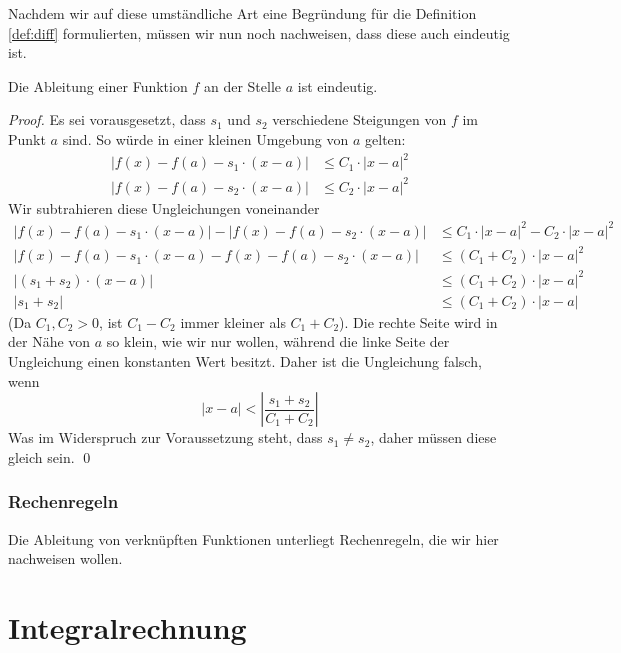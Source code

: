 Nachdem wir auf diese umständliche Art eine Begründung für die Definition \ref{def:diff} formulierten, müssen wir nun noch nachweisen, dass diese auch eindeutig ist. 

\begin{lemma}
Die Ableitung einer Funktion $f$ an der Stelle $a$ ist eindeutig. 
\end{lemma}
\begin{proof}
Es sei vorausgesetzt, dass $s_1$ und $s_2$ verschiedene Steigungen von $f$ im Punkt $a$ sind. So würde in einer kleinen Umgebung von $a$ gelten:
\begin{equation*}
\begin{split}
|f(x)-f(a) -s_1\cdot (x-a)| &\le C_1\cdot |x-a|^2 \\
|f(x)-f(a) -s_2\cdot (x-a)| &\le C_2\cdot |x-a|^2
\end{split}
\end{equation*}
Wir subtrahieren diese Ungleichungen voneinander
\begin{equation}
\begin{split}
|f(x)-f(a) -s_1\cdot (x-a)|-|f(x)-f(a) -s_2\cdot (x-a)| &\le C_1\cdot |x-a|^2-C_2\cdot |x-a|^2 \\
|f(x)-f(a) -s_1\cdot (x-a)-f(x)-f(a) -s_2\cdot (x-a)| &\le (C_1+C_2)\cdot |x-a|^2 \\
|(s_1+s_2)\cdot (x-a)| &\le (C_1+C_2)\cdot |x-a|^2 \\
|s_1+s_2| &\le (C_1+C_2)\cdot |x-a|
\end{split}
\end{equation}
(Da $C_1,C_2 >0$, ist $C_1-C_2$ immer kleiner als $C_1+C_2$). Die rechte Seite wird in der Nähe von $a$ so klein, wie wir nur wollen, während die linke Seite der Ungleichung einen konstanten Wert besitzt. Daher ist die Ungleichung falsch, wenn 
\[
|x-a| < \left| \frac{s_1+s_2}{C_1+C_2} \right|
\]
Was im Widerspruch zur Voraussetzung steht, dass $s_1\ne s_2$, daher müssen diese gleich sein.
\qed
\end{proof}

\subsection{Rechenregeln}

Die Ableitung von verknüpften Funktionen unterliegt Rechenregeln, die wir hier nachweisen wollen. 


\chapter{Integralrechnung}


